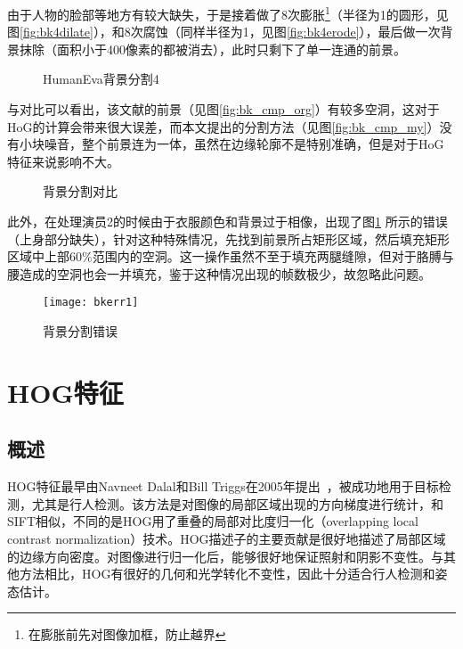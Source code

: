 由于人物的脸部等地方有较大缺失，于是接着做了8次膨胀\footnote{在膨胀前先对图像加框，防止越界}（半径为1的圆形，见图\ref{fig:bk4dilate}），和8次腐蚀（同样半径为1，见图\ref{fig:bk4erode}），最后做一次背景抹除（面积小于400像素的都被消去），此时只剩下了单一连通的前景。

\begin{figure}[htbp]
  \centering
  \hspace{1cm}
  \caption{HumanEva背景分割4}
\end{figure}

与\cite{Poppe2007}对比可以看出，该文献的前景（见图\ref{fig:bk_cmp_org}）有较多空洞，这对于HoG的计算会带来很大误差，而本文提出的分割方法（见图\ref{fig:bk_cmp_my}）没有小块噪音，整个前景连为一体，虽然在边缘轮廓不是特别准确，但是对于HoG特征来说影响不大。

\begin{figure}[htbp]
  \centering
  \hspace{1cm}
  \hspace{1cm}
  \caption{背景分割对比}
\end{figure}

此外，在处理演员2的时候由于衣服颜色和背景过于相像，出现了图\ref{fig:bkerr} 所示的错误（上身部分缺失），针对这种特殊情况，先找到前景所占矩形区域，然后填充矩形区域中上部60\%范围内的空洞。这一操作虽然不至于填充两腿缝隙，但对于胳膊与腰造成的空洞也会一并填充，鉴于这种情况出现的帧数极少，故忽略此问题。

\begin{figure}[htbp]
  \centering
  \texttt{[image: bkerr1]}
  \caption{背景分割错误}\label{fig:bkerr}
\end{figure}

\section{HOG特征}
\subsection{概述}
HOG特征最早由Navneet Dalal和Bill Triggs在2005年提出~\cite{Dalal05histogramsof}，被成功地用于目标检测，尤其是行人检测。该方法是对图像的局部区域出现的方向梯度进行统计，和SIFT相似，不同的是HOG用了重叠的局部对比度归一化（overlapping local contrast normalization）技术。HOG描述子的主要贡献是很好地描述了局部区域的边缘方向密度。对图像进行归一化后，能够很好地保证照射和阴影不变性。与其他方法相比，HOG有很好的几何和光学转化不变性，因此十分适合行人检测和姿态估计。

